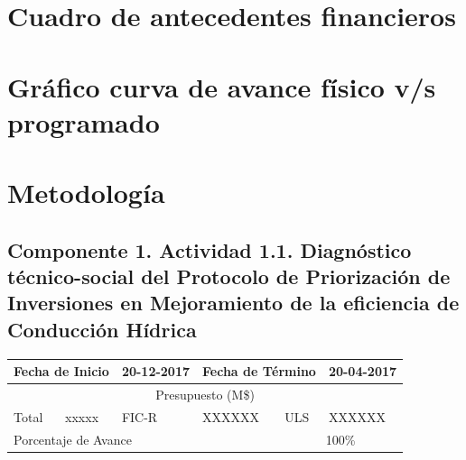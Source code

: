 \documentclass[]{article}
\begin{document}
\clearpage
\section{Cuadro de antecedentes financieros}

\clearpage
\section{Gráfico curva de avance físico v/s programado}

\clearpage
\section{Metodología}

\subsection{Componente 1. Actividad 1.1. Diagnóstico técnico-social del Protocolo de Priorización de Inversiones en Mejoramiento de la eficiencia de Conducción Hídrica}

\begin{table}[!htb]
\centering
\begin{tabular}{|p{2cm}|p{2cm}|p{2cm}|p{2cm}|p{2cm}|p{2cm}|}
    \hline
    \multicolumn{2}{|l|}{Fecha de Inicio} & 20-12-2017 & \multicolumn{2}{l|}{Fecha de Término} & 20-04-2017\\
    \hline
    \multicolumn{6}{|c|}{Presupuesto (M\$)}\\
    \hline
    Total & xxxxx & FIC-R & XXXXXX & ULS & XXXXXX\\
    \hline
    \multicolumn{4}{|l|}{Porcentaje de Avance} & \multicolumn{2}{c|}{100\%}\\
    \hline
\end{tabular}
\end{table}
\end{document}
